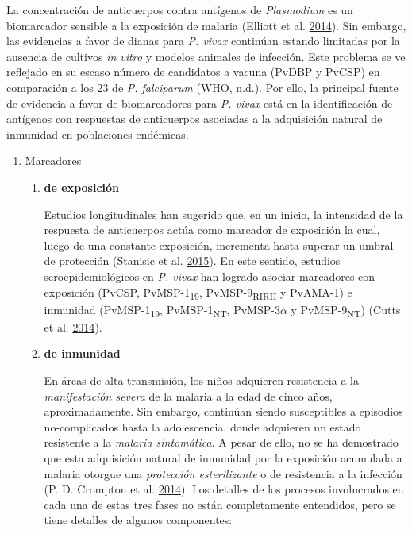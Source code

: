 \documentclass[a4paper]{article}
\begin{document}
La concentración de anticuerpos contra antígenos de \emph{Plasmodium} es
un biomarcador sensible a la exposición de malaria (Elliott et al.
\protect\hyperlink{ref-elliott2014}{2014}). Sin embargo, las evidencias
a favor de dianas para \emph{P. vivax} continúan estando limitadas por
la ausencia de cultivos \emph{in vitro} y modelos animales de infección.
Este problema se ve reflejado en su escaso número de candidatos a vacuna
(PvDBP y PvCSP) en comparación a los 23 de \emph{P. falciparum} (WHO,
n.d.). Por ello, la principal fuente de evidencia a favor de
biomarcadores para \emph{P. vivax} está en la identificación de
antígenos con respuestas de anticuerpos asociadas a la adquisición
natural de inmunidad en poblaciones endémicas.

\begin{enumerate}
\def\labelenumi{\alph{enumi}.}
\item
  Marcadores

  \begin{enumerate}
  \def\labelenumii{\roman{enumii}.}
  \item
    \textbf{de exposición}

    Estudios longitudinales han sugerido que, en un inicio, la
    intensidad de la respuesta de anticuerpos actúa como marcador de
    exposición la cual, luego de una constante exposición, incrementa
    hasta superar un umbral de protección (Stanisic et al.
    \protect\hyperlink{ref-Stanisic2015}{2015}). En este sentido,
    estudios seroepidemiológicos en \emph{P. vivax} han logrado asociar
    marcadores con exposición (PvCSP, PvMSP-1\textsubscript{19},
    PvMSP-9\textsubscript{RIRII} y PvAMA-1) e inmunidad
    (PvMSP-1\textsubscript{19}, PvMSP-1\textsubscript{NT},
    PvMSP-3\(\alpha\) y PvMSP-9\textsubscript{NT}) (Cutts et al.
    \protect\hyperlink{ref-cutts2014meta}{2014}). 
  \item
    \textbf{de inmunidad}

    En áreas de alta transmisión, los niños adquieren resistencia a la
    \emph{manifestación severa} de la malaria a la edad de cinco años,
    aproximadamente. Sin embargo, continúan siendo susceptibles a
    episodios no-complicados hasta la adolescencia, donde adquieren un
    estado resistente a la \emph{malaria sintomática}. A pesar de ello,
    no se ha demostrado que esta adquisición natural de inmunidad por la
    exposición acumulada a malaria otorgue una \emph{protección
    esterilizante} o de resistencia a la infección (P. D. Crompton et
    al. \protect\hyperlink{ref-crompton2014rev}{2014}). Los detalles de
    los procesos involucrados en cada una de estas tres fases no están
    completamente entendidos, pero se tiene detalles de algunos
    componentes:


\end{enumerate}
\end{enumerate}
\end{document}
